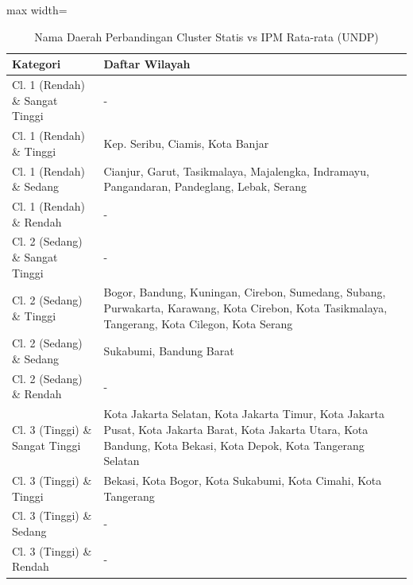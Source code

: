 \begin{table}[H]
\centering
\caption{Nama Daerah Perbandingan Cluster Statis vs IPM Rata-rata (UNDP)} \label{tab:appstatis_ipm_avg_name}
\begin{adjustbox}{max width=\textwidth}
\begin{tabular}{|p{4cm}|p{10cm}|}
\hline
\textbf{Kategori} & \textbf{Daftar Wilayah} \\
\hline
Cl. 1 (Rendah) \& Sangat Tinggi & - \\
\hline
Cl. 1 (Rendah) \& Tinggi & Kep. Seribu, Ciamis, Kota Banjar \\
\hline
Cl. 1 (Rendah) \& Sedang & Cianjur, Garut, Tasikmalaya, Majalengka, Indramayu, Pangandaran, Pandeglang, Lebak, Serang \\
\hline
Cl. 1 (Rendah) \& Rendah & - \\
\hline
Cl. 2 (Sedang) \& Sangat Tinggi & - \\
\hline
Cl. 2 (Sedang) \& Tinggi & Bogor, Bandung, Kuningan, Cirebon, Sumedang, Subang, Purwakarta, Karawang, Kota Cirebon, Kota Tasikmalaya, Tangerang, Kota Cilegon, Kota Serang \\
\hline
Cl. 2 (Sedang) \& Sedang & Sukabumi, Bandung Barat \\
\hline
Cl. 2 (Sedang) \& Rendah & - \\
\hline
Cl. 3 (Tinggi) \& Sangat Tinggi & Kota Jakarta Selatan, Kota Jakarta Timur, Kota Jakarta Pusat, Kota Jakarta Barat, Kota Jakarta Utara, Kota Bandung, Kota Bekasi, Kota Depok, Kota Tangerang Selatan \\
\hline
Cl. 3 (Tinggi) \& Tinggi & Bekasi, Kota Bogor, Kota Sukabumi, Kota Cimahi, Kota Tangerang \\
\hline
Cl. 3 (Tinggi) \& Sedang & - \\
\hline
Cl. 3 (Tinggi) \& Rendah & - \\
\hline
\end{tabular}
\end{adjustbox}
\end{table}
